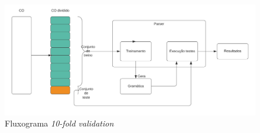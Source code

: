\begin{figure}[!ht]
    \centering
    \includegraphics[width=\textwidth,scale=1.5]{imagens/fluxograma_10fold.png}
    \caption[Fluxograma \textit{10-fold validation}]{Fluxograma \textit{10-fold validation}}
    \label{fig:fluxograma_10fold}
\end{figure}
